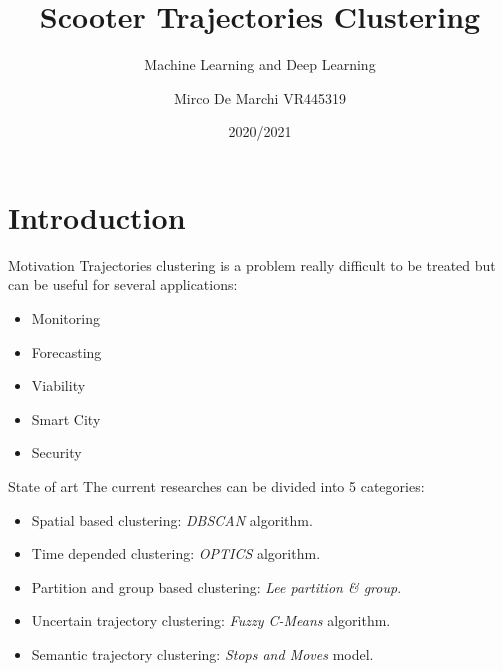 \documentclass{beamer}
\title{Scooter Trajectories Clustering}
\subtitle{Machine Learning and Deep Learning}
\author{Mirco De Marchi VR445319}
\institute{University of Verona}
\date{2020/2021}
\begin{document}
\begin{frame}
\maketitle
\end{frame}


\section{Introduction}

\begin{frame}{Motivation}
 Trajectories clustering is a problem really difficult to be treated but  can be useful for several applications:
 \begin{itemize}
 	\item Monitoring
 	\item Forecasting
 	\item Viability
 	\item Smart City
 	\item Security
 \end{itemize}
\end{frame}

\begin{frame}{State of art}
The current researches can be divided into 5 categories:
\begin{itemize}
	\item Spatial based clustering: \textit{DBSCAN} algorithm.
	\item Time depended clustering: \textit{OPTICS} algorithm.
	\item Partition and group based clustering: \textit{Lee partition \& group}.
	\item Uncertain trajectory clustering: \textit{Fuzzy C-Means} algorithm.
	\item Semantic trajectory clustering: \textit{Stops and Moves} model.
\end{itemize}
\end{frame}
\end{document}
